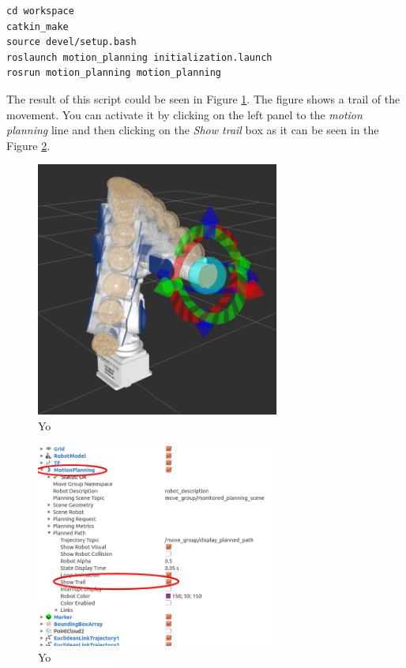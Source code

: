 \begin{lstlisting}
cd workspace
catkin_make
source devel/setup.bash
roslaunch motion_planning initialization.launch
rosrun motion_planning motion_planning
\end{lstlisting}


The result of this script could be seen in Figure \ref{fig:simple_moving}. The figure shows a trail of the movement. You can activate it by clicking on the left panel to the \emph{motion planning} line and then clicking on the \emph{Show trail} box as it can be seen in the Figure \ref{fig:show_trail}.  

\begin{figure}
\includegraphics[width=8cm]{images/installation_first/simple_moving.png}
\centering
\caption{Yo}
\label{fig:simple_moving}
\end{figure}



\begin{figure}
\includegraphics[width=8cm]{images/installation_first/show_trail.png}
\centering
\caption{Yo}
\label{fig:show_trail}
\end{figure}